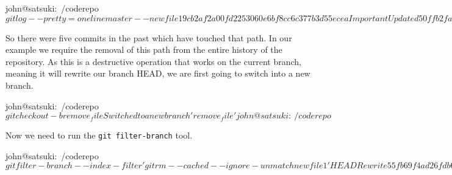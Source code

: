 \begin{code}
john@satsuki:~/coderepo$ git log --pretty=oneline master -- newfile1
9cb2af2a00fd2253060e6bf8cc6c377b3d55ecea Important Update
d50ffb2fa536d869f2c4e89e8d6a48e0a29c5cc1 Merged in zaney
a27d49ef11d9f0e66edbad8f6c7806510ad5b2be Made an awesome change
cfbecabb031696a217b77b0e1285f2d5fc2ea2a3 Fantastic new feature
55fb69f4ad26fdb6b90ac6f43431be40779962dd Added two new files
john@satsuki:~/coderepo$
\end{code}

So there were five commits in the past which have touched that path.
In our example we require the removal of this path from the entire history of the repository.
As this is a destructive operation that works on the current branch, meaning it will rewrite our branch HEAD, we are first going to switch into a new branch.

\begin{code}
john@satsuki:~/coderepo$ git checkout -b remove_file
Switched to a new branch 'remove_file'
john@satsuki:~/coderepo$ 
\end{code}

Now we need to run the \texttt{git filter-branch} tool.

\begin{code}
john@satsuki:~/coderepo$ git filter-branch --index-filter 'git rm --cached --ignore-unmatch newfile1' HEAD
Rewrite 55fb69f4ad26fdb6b90ac6f43431be40779962dd (6/21)rm 'newfile1'
Rewrite 9710177657ae00665ca8f8027b17314346a5b1c4 (7/21)rm 'newfile1'
Rewrite 4ac92012609cf8ed2480aa5d7f807caf2545fe2f (8/21)rm 'newfile1'
Rewrite cfbecabb031696a217b77b0e1285f2d5fc2ea2a3 (9/21)rm 'newfile1'
Rewrite b119573f4508514c55e1c4e3bebec0ab3667d071 (10/21)rm 'newfile1'
Rewrite ed2301ba223a63a5a930b536a043444e019460a7 (11/21)rm 'newfile1'
Rewrite a27d49ef11d9f0e66edbad8f6c7806510ad5b2be (12/21)rm 'newfile1'
Rewrite 7cc32dbf121f2afa8c40337db54bafb26de5b9c4 (13/21)rm 'newfile1'
Rewrite d50ffb2fa536d869f2c4e89e8d6a48e0a29c5cc1 (14/21)rm 'newfile1'
Rewrite 9cb2af2a00fd2253060e6bf8cc6c377b3d55ecea (15/21)rm 'newfile1'
Rewrite 37950f861a3cc0868c65ee9571fc6c491aa689ea (16/21)rm 'newfile1'
Rewrite 1c3206aac0fb012bfdaf5ff00e320b565bb89e7d (17/21)rm 'newfile1'
Rewrite 1968324ce2899883fca76bc25496bcf2b15e7011 (18/21)rm 'newfile1'
Rewrite f8d5100142b43ffaba9bbd539ba4fd92af79bf0e (19/21)rm 'newfile1'
Rewrite a8281fb589e36389cc8cb0da7ebee225b4d1adfc (20/21)rm 'newfile1'
Rewrite 30900fe1b7e72411dabab8b02070f36e2431f704 (21/21)rm 'newfile1'

Ref 'refs/heads/remove_file' was rewritten
john@satsuki:~/coderepo$
\end{code}

